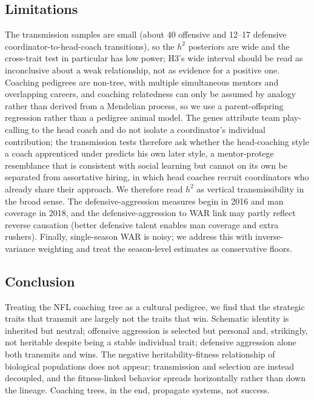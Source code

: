 \documentclass[11pt]{article}
\begin{document}
\subsection{Limitations}
The transmission samples are small (about 40 offensive and 12--17 defensive
coordinator-to-head-coach transitions), so the $h^{2}$ posteriors are wide and the
cross-trait test in particular has low power; H3's wide interval should be read as
inconclusive about a weak relationship, not as evidence for a positive one.
Coaching pedigrees are non-tree, with multiple simultaneous mentors and overlapping
careers, and coaching relatedness can only be assumed by analogy rather than
derived from a Mendelian process, so we use a parent-offspring regression rather
than a pedigree animal model. The genes attribute team play-calling to the head
coach and do not isolate a coordinator's individual contribution; the transmission
tests therefore ask whether the head-coaching style a coach apprenticed under
predicts his own later style, a mentor-protege resemblance that is consistent with
social learning but cannot on its own be separated from assortative hiring, in
which head coaches recruit coordinators who already share their approach. We
therefore read $h^{2}$ as vertical transmissibility in the broad sense. The
defensive-aggression measures begin in 2016 and man coverage in 2018, and the
defensive-aggression to WAR link may partly reflect reverse causation (better
defensive talent enables man coverage and extra rushers). Finally, single-season
WAR is noisy; we address this with inverse-variance weighting and treat the
season-level estimates as conservative floors.

\subsection{Conclusion}
Treating the NFL coaching tree as a cultural pedigree, we find that the strategic
traits that transmit are largely not the traits that win. Schematic identity is
inherited but neutral; offensive aggression is selected but personal and,
strikingly, not heritable despite being a stable individual trait; defensive
aggression alone both transmits and wins. The negative heritability-fitness
relationship of biological populations does not appear; transmission and selection
are instead decoupled, and the fitness-linked behavior spreads horizontally rather
than down the lineage. Coaching trees, in the end, propagate systems, not success.

\end{document}
